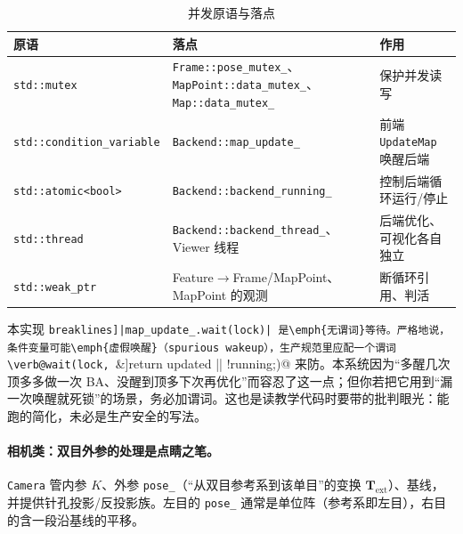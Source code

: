 \begin{table}[H]\centering\small
\caption{并发原语与落点}
\label{tab:sys-concurrency}
\begin{tabularx}{\linewidth}{lLL}
\toprule
原语 & 落点 & 作用 \\
\midrule
\texttt{std::mutex} & \texttt{Frame::pose\_mutex\_}、\texttt{MapPoint::data\_mutex\_}、\texttt{Map::data\_mutex\_} & 保护并发读写 \\
\texttt{std::condition\_variable} & \texttt{Backend::map\_update\_} & 前端 \texttt{UpdateMap} 唤醒后端 \\
\texttt{std::atomic<bool>} & \texttt{Backend::backend\_running\_} & 控制后端循环运行/停止 \\
\texttt{std::thread} & \texttt{Backend::backend\_thread\_}、Viewer 线程 & 后端优化、可视化各自独立 \\
\texttt{std::weak\_ptr} & Feature$\to$Frame/MapPoint、MapPoint 的观测 & 断循环引用、判活 \\
\bottomrule
\end{tabularx}
\end{table}

\begin{pitfall}
本实现 \Verb[breaklines]|map_update_.wait(lock)| 是\emph{无谓词}等待。严格地说，条件变量可能\emph{虚假唤醒}（spurious wakeup），生产规范里应配一个谓词 \verb@wait(lock, [&]{return updated || !running;})@ 来防。本系统因为“多醒几次顶多多做一次 BA、没醒到顶多下次再优化”而容忍了这一点；但你若把它用到“漏一次唤醒就死锁”的场景，务必加谓词。这也是读教学代码时要带的批判眼光：能跑的简化，未必是生产安全的写法。
\end{pitfall}

\paragraph{相机类：双目外参的处理是点睛之笔。}
\texttt{Camera} 管内参 $K$、外参 \texttt{pose\_}（“从双目参考系到该单目”的变换 $\mathbf{T}_{\mathrm{ext}}$）、基线，并提供针孔投影/反投影族。左目的 \texttt{pose\_} 通常是单位阵（参考系即左目），右目的含一段沿基线的平移。

